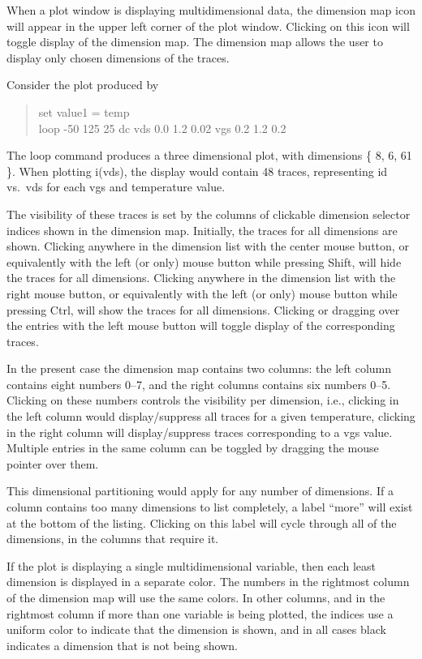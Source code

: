 When a plot window is displaying multidimensional data, the dimension
map icon will appear in the upper left corner of the plot window. 
Clicking on this icon will toggle display of the dimension map.  The
dimension map allows the user to display only chosen dimensions of the
traces.

Consider the plot produced by

\begin{quote}
{\vt set value1 = temp}\\
{\vt loop -50 125 25 dc vds 0.0 1.2 0.02 vgs 0.2 1.2 0.2}
\end{quote}

The {\cb loop} command produces a three dimensional plot, with
dimensions \{ 8, 6, 61 \}.  When plotting {\vt i(vds)}, the display
would contain 48 traces, representing {\vt id} vs.\ {\vt vds} for each
{\vt vgs} and temperature value.

The visibility of these traces is set by the columns of clickable
dimension selector indices shown in the dimension map.  Initially, the
traces for all dimensions are shown.  Clicking anywhere in the
dimension list with the center mouse button, or equivalently with the
left (or only) mouse button while pressing {\kb Shift}, will hide the
traces for all dimensions.  Clicking anywhere in the dimension list
with the right mouse button, or equivalently with the left (or only)
mouse button while pressing {\kb Ctrl}, will show the traces for all
dimensions.  Clicking or dragging over the entries with the left mouse
button will toggle display of the corresponding traces.

In the present case the dimension map contains two columns:  the left
column contains eight numbers 0--7, and the right columns contains six
numbers 0--5.  Clicking on these numbers controls the visibility per
dimension, i.e., clicking in the left column would display/suppress
all traces for a given temperature, clicking in the right column will
display/suppress traces corresponding to a {\vt vgs} value.  Multiple
entries in the same column can be toggled by dragging the mouse
pointer over them.

This dimensional partitioning would apply for any number of
dimensions.  If a column contains too many dimensions to list
completely, a label ``more'' will exist at the bottom of the listing. 
Clicking on this label will cycle through all of the dimensions, in
the columns that require it.

If the plot is displaying a single multidimensional variable, then
each least dimension is displayed in a separate color.  The numbers in
the rightmost column of the dimension map will use the same colors. 
In other columns, and in the rightmost column if more than one
variable is being plotted, the indices use a uniform color to indicate
that the dimension is shown, and in all cases black indicates a
dimension that is not being shown.

